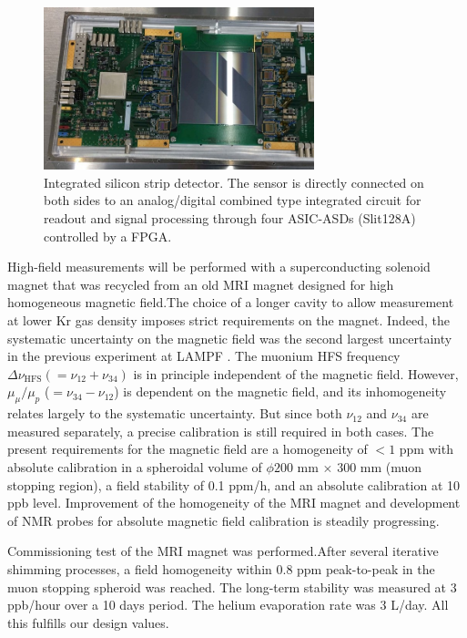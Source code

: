 \begin{figure}[th]
 \centering
 \includegraphics[width=0.7\textwidth, bb=0 0 229 138]
                 {./Fig/MuHFS-IntegratedSiliconStripDetector.jpg}
\caption{\label{fig:MuSEUM-IntegratedSiliconStripDetector}
Integrated silicon strip detector.  The sensor is directly
connected on both sides to an analog/digital combined type
integrated circuit for readout and signal processing through
four ASIC-ASDs (Slit128A) controlled by a FPGA.}
\end{figure}

High-field measurements will be performed with a superconducting
solenoid magnet that was recycled from an old MRI magnet designed
for high homogeneous magnetic field.The choice of a longer cavity
to allow measurement at lower Kr gas density imposes strict
requirements on the magnet.  Indeed, the systematic uncertainty
on the magnetic field was the second largest uncertainty in
the previous experiment at LAMPF \cite{Liu:1999iz}.  
The muonium HFS frequency
$\Delta \nu_{\text{HFS}} (=\nu_{12}+\nu_{34})$ is in principle
independent of the magnetic field.  However, $\mu_\mu/\mu_p$
($=\nu_{34}- \nu_{12}$) is dependent on the magnetic field, 
and its inhomogeneity relates largely to the systematic
uncertainty.  But since both $\nu_{12}$ and $\nu_{34}$ are
measured separately, a precise calibration is still required
in both cases.  The present requirements for the magnetic
field are a homogeneity of $<1$ ppm with absolute calibration
in a spheroidal volume of $\phi 200$ mm $\times$ 300 mm
(muon stopping region), a field stability of 0.1 ppm/h,
and an absolute calibration at 10 ppb level.  Improvement
of the homogeneity of the MRI magnet and development of NMR
probes for absolute magnetic field calibration is steadily
progressing.


Commissioning test of the MRI magnet was performed.After several
iterative shimming processes, a field homogeneity within 0.8
ppm peak-to-peak in the muon stopping spheroid was reached.
The long-term stability was measured at 3 ppb/hour over a 10
days period.  The helium evaporation rate was 3 L/day.  All
this fulfills our design values.

